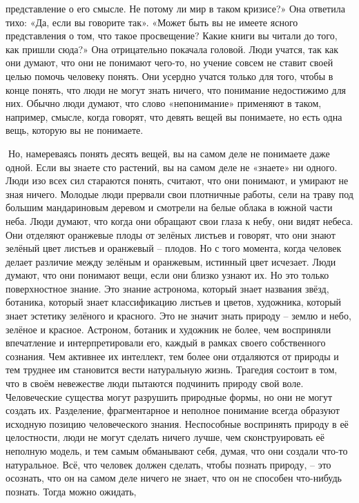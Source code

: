 \documentclass[a4paper]{book}
\begin{document}
представление о его смысле. Не потому ли мир в таком кризисе?»
Она ответила тихо: «Да, если вы говорите так». «Может быть вы не имеете ясного
представления о том, что такое просвещение? Какие книги вы читали до того, как пришли
сюда?» Она отрицательно покачала головой.
Люди учатся, так как они думают, что они не понимают чего-то, но учение совсем не
ставит своей целью помочь человеку понять. Они усердно учатся только для того, чтобы в
конце понять, что люди не могут знать ничего, что понимание недостижимо для них.
Обычно люди думают, что слово «непонимание» применяют в таком, например, смысле,
когда говорят, что девять вещей вы понимаете, но есть одна вещь, которую вы не понимаете.

Но, намереваясь понять десять вещей, вы на самом деле не понимаете даже одной. Если вы
знаете сто растений, вы на самом деле не «знаете» ни одного. Люди изо всех сил стараются
понять, считают, что они понимают, и умирают не зная ничего.
Молодые люди прервали свои плотничные работы, сели на траву под большим
мандариновым деревом и смотрели на белые облака в южной части неба. Люди думают, что
когда они обращают свои глаза к небу, они видят небеса. Они отделяют оранжевые плоды от
зелёных листьев и говорят, что они знают зелёный цвет листьев и оранжевый – плодов. Но с
того момента, когда человек делает различие между зелёным и оранжевым, истинный цвет
исчезает.
Люди думают, что они понимают вещи, если они близко узнают их. Но это только
поверхностное знание. Это знание астронома, который знает названия звёзд, ботаника,
который знает классификацию листьев и цветов, художника, который знает эстетику
зелёного и красного. Это не значит знать природу – землю и небо, зелёное и красное.
Астроном, ботаник и художник не более, чем восприняли впечатление и интерпретировали
его, каждый в рамках своего собственного сознания. Чем активнее их интеллект, тем более
они отдаляются от природы и тем труднее им становится вести натуральную жизнь.
Трагедия состоит в том, что в своём невежестве люди пытаются подчинить природу
свой воле. Человеческие существа могут разрушить природные формы, но они не могут
создать их. Разделение, фрагментарное и неполное понимание всегда образуют исходную
позицию человеческого знания. Неспособные воспринять природу в её целостности, люди
не могут сделать ничего лучше, чем сконструировать её неполную модель, и тем самым
обманывают себя, думая, что они создали что-то натуральное.
Всё, что человек должен сделать, чтобы познать природу, – это осознать, что он на
самом деле ничего не знает, что он не способен что-нибудь познать. Тогда можно ожидать,
\end{document}
